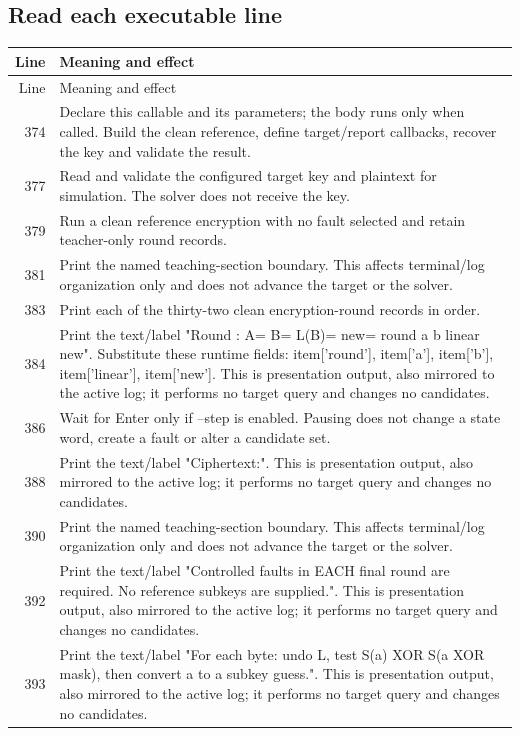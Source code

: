 \subsection*{Read each executable line}
\begingroup\small\begin{longtable}{r >{\raggedright\arraybackslash}p{138mm}}\toprule Line&Meaning and effect\\\midrule\endfirsthead\toprule Line&Meaning and effect\\\midrule\endhead
374&Declare this callable and its parameters; the body runs only when called. Build the clean reference, define target/report callbacks, recover the key and validate the result.\\
377&Read and validate the configured target key and plaintext for simulation. The solver does not receive the key.\\
379&Run a clean reference encryption with no fault selected and retain teacher-only round records.\\
381&Print the named teaching-section boundary. This affects terminal/log organization only and does not advance the target or the solver.\\
383&Print each of the thirty-two clean encryption-round records in order.\\
384&Print the text/label "Round  : A=  B=  L(B)=  new= round a b linear new". Substitute these runtime fields: item['round'], item['a'], item['b'], item['linear'], item['new']. This is presentation output, also mirrored to the active log; it performs no target query and changes no candidates.\\
386&Wait for Enter only if --step is enabled. Pausing does not change a state word, create a fault or alter a candidate set.\\
388&Print the text/label "Ciphertext:". This is presentation output, also mirrored to the active log; it performs no target query and changes no candidates.\\
390&Print the named teaching-section boundary. This affects terminal/log organization only and does not advance the target or the solver.\\
392&Print the text/label "Controlled faults in EACH final round are required. No reference subkeys are supplied.". This is presentation output, also mirrored to the active log; it performs no target query and changes no candidates.\\
393&Print the text/label "For each byte: undo L, test S(a) XOR S(a XOR mask), then convert a to a subkey guess.". This is presentation output, also mirrored to the active log; it performs no target query and changes no candidates.\\

\end{longtable}
